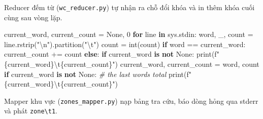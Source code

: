 \documentclass[
  12pt,
  a4paper,
]{article}
\newenvironment{Shaded}{}{}
\newcommand{\BuiltInTok}[1]{\textcolor[rgb]{0.00,0.50,0.00}{#1}}
\newcommand{\CharTok}[1]{\textcolor[rgb]{0.25,0.44,0.63}{#1}}
\newcommand{\CommentTok}[1]{\textcolor[rgb]{0.38,0.63,0.69}{\textit{#1}}}
\newcommand{\ControlFlowTok}[1]{\textcolor[rgb]{0.00,0.44,0.13}{\textbf{#1}}}
\newcommand{\DecValTok}[1]{\textcolor[rgb]{0.25,0.63,0.44}{#1}}
\newcommand{\KeywordTok}[1]{\textcolor[rgb]{0.00,0.44,0.13}{\textbf{#1}}}
\newcommand{\NormalTok}[1]{#1}
\newcommand{\OperatorTok}[1]{\textcolor[rgb]{0.40,0.40,0.40}{#1}}
\newcommand{\SpecialCharTok}[1]{\textcolor[rgb]{0.25,0.44,0.63}{#1}}
\newcommand{\SpecialStringTok}[1]{\textcolor[rgb]{0.73,0.40,0.53}{#1}}
\newcommand{\StringTok}[1]{\textcolor[rgb]{0.25,0.44,0.63}{#1}}
\newcommand{\VariableTok}[1]{\textcolor[rgb]{0.10,0.09,0.49}{#1}}
\begin{document}
Reducer đếm từ (\texttt{wc\_reducer.py}) tự nhận ra chỗ đổi khóa và in
thêm khóa cuối cùng sau vòng lặp.

\begin{Shaded}
\begin{Highlighting}[]
\NormalTok{current\_word, current\_count }\OperatorTok{=} \VariableTok{None}\NormalTok{, }\DecValTok{0}
\ControlFlowTok{for}\NormalTok{ line }\KeywordTok{in}\NormalTok{ sys.stdin:}
\NormalTok{    word, \_, count }\OperatorTok{=}\NormalTok{ line.rstrip(}\StringTok{"}\CharTok{\textbackslash{}n}\StringTok{"}\NormalTok{).partition(}\StringTok{"}\CharTok{\textbackslash{}t}\StringTok{"}\NormalTok{)}
\NormalTok{    count }\OperatorTok{=} \BuiltInTok{int}\NormalTok{(count)}
    \ControlFlowTok{if}\NormalTok{ word }\OperatorTok{==}\NormalTok{ current\_word:}
\NormalTok{        current\_count }\OperatorTok{+=}\NormalTok{ count}
    \ControlFlowTok{else}\NormalTok{:}
        \ControlFlowTok{if}\NormalTok{ current\_word }\KeywordTok{is} \KeywordTok{not} \VariableTok{None}\NormalTok{:}
            \BuiltInTok{print}\NormalTok{(}\SpecialStringTok{f"}\SpecialCharTok{\{}\NormalTok{current\_word}\SpecialCharTok{\}}\CharTok{\textbackslash{}t}\SpecialCharTok{\{}\NormalTok{current\_count}\SpecialCharTok{\}}\SpecialStringTok{"}\NormalTok{)}
\NormalTok{        current\_word, current\_count }\OperatorTok{=}\NormalTok{ word, count}
\ControlFlowTok{if}\NormalTok{ current\_word }\KeywordTok{is} \KeywordTok{not} \VariableTok{None}\NormalTok{:  }\CommentTok{\# the last word\textquotesingle{}s total}
    \BuiltInTok{print}\NormalTok{(}\SpecialStringTok{f"}\SpecialCharTok{\{}\NormalTok{current\_word}\SpecialCharTok{\}}\CharTok{\textbackslash{}t}\SpecialCharTok{\{}\NormalTok{current\_count}\SpecialCharTok{\}}\SpecialStringTok{"}\NormalTok{)}
\end{Highlighting}
\end{Shaded}

Mapper khu vực (\texttt{zones\_mapper.py}) nạp bảng tra cứu, báo dòng
hỏng qua stderr và phát \texttt{zone\textbackslash{}t1}.
\end{document}
